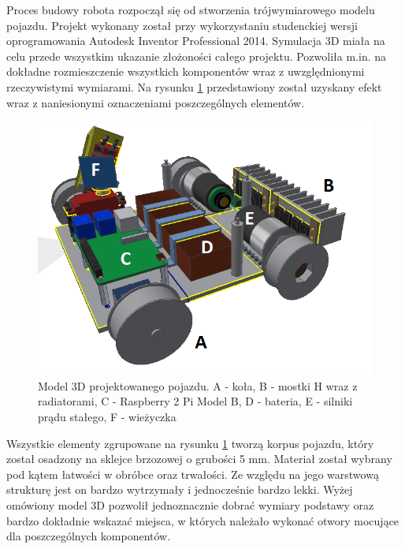 Proces budowy robota rozpoczął się od stworzenia trójwymiarowego modelu pojazdu. Projekt wykonany został przy wykorzystaniu studenckiej wersji oprogramowania Autodesk Inventor Professional 2014. Symulacja 3D miała na celu przede wszystkim ukazanie złożoności całego projektu. Pozwoliła m.in. na dokładne rozmieszczenie wszystkich komponentów wraz z uwzględnionymi rzeczywistymi wymiarami. Na rysunku \ref{mod3d} przedstawiony został uzyskany efekt wraz z naniesionymi oznaczeniami poszczególnych elementów. 

  \begin{figure}[H]
    \begin{center}
      \includegraphics[scale=0.55]{imgs/calosc_2.png}
 	\caption[Model 3D projektowanego czołgu.]{\small{Model 3D projektowanego pojazdu. A - koła, B - mostki H wraz z radiatorami, C - Raspberry 2 Pi Model B, D - bateria, E - silniki prądu stałego, F - wieżyczka}}
	\label{mod3d}
    \end{center}
  \end{figure}
Wszystkie elementy zgrupowane na rysunku \ref{mod3d} tworzą korpus pojazdu, który został osadzony na sklejce brzozowej o grubości 5 mm. Materiał został wybrany pod kątem łatwości w obróbce oraz trwałości. Ze względu na jego warstwową strukturę jest on bardzo wytrzymały i jednocześnie bardzo lekki. Wyżej omówiony model 3D pozwolił jednoznacznie dobrać wymiary podstawy oraz bardzo dokładnie wskazać miejsca, w których należało wykonać otwory mocujące dla poszczególnych komponentów. 

